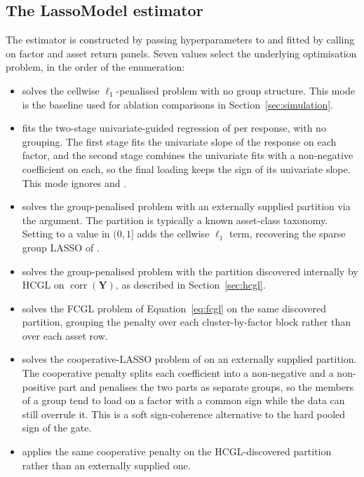 \documentclass[article]{jss}
\begin{document}
\subsection[The LassoModel estimator]{The LassoModel estimator} \label{sec:lasso-model}

The estimator is constructed by passing hyperparameters to
 and fitted by calling  on factor
and asset return panels. Seven  values select the underlying optimisation
problem, in the order of the  enumeration:

\begin{itemize}
\item {} solves the cellwise
$\ell_1$-penalised problem with no group structure. This mode is the
baseline used for ablation comparisons in Section~\ref{sec:simulation}.
\item {} fits the two-stage
univariate-guided regression of \cite{Chatterjee+Hastie+Tibshirani:2025}
per response, with no grouping. The first stage fits the univariate slope
of the response on each factor, and the second stage combines the
univariate fits with a non-negative coefficient on each, so the final
loading keeps the sign of its univariate slope. This mode ignores
 and .
\item {} solves the group-penalised
problem with an externally supplied partition via the
 argument. The partition is typically a known
asset-class taxonomy. Setting  to a value in $(0, 1]$
adds the cellwise $\ell_1$ term, recovering the sparse group LASSO of
\cite{Simon+Friedman+Hastie+Tibshirani:2013}.
\item {} solves the group-penalised
problem with the partition discovered internally by HCGL on
$\operatorname{corr}(\bm{Y})$, as described in Section~\ref{sec:hcgl}.
\item {} solves the FCGL
problem of Equation~\ref{eq:fcgl} on the same discovered partition,
grouping the penalty over each cluster-by-factor block rather than over
each asset row.
\item {} solves the
cooperative-LASSO problem of \cite{Chiquet+Grandvalet+Charbonnier:2012}
on an externally supplied partition. The cooperative penalty splits each
coefficient into a non-negative and a non-positive part and penalises the
two parts as separate groups, so the members of a group tend to load on a
factor with a common sign while the data can still overrule it. This is a
soft sign-coherence alternative to the hard pooled sign of the gate.
\item {} applies the
same cooperative penalty on the HCGL-discovered partition rather than an
externally supplied one.
\end{itemize}
\end{document}
